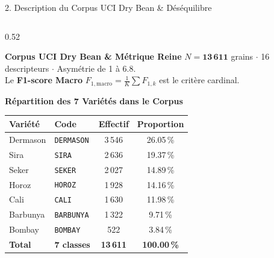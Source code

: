 \documentclass[aspectratio=169,10pt]{beamer}
\begin{document}
\begin{frame}{2. Description du Corpus UCI Dry Bean \& Déséquilibre}
    \begin{columns}[T]
        \begin{column}{0.52\textwidth}
            \begin{block}{\textbf{Corpus UCI Dry Bean \& Métrique Reine}}
                \scriptsize
                $N = \mathbf{13\,611}$ grains $\cdot$ 16 descripteurs $\cdot$ Asymétrie de 1 à 6.8.\\
                Le \textbf{F1-score Macro} $F_{1,\text{macro}} = \frac{1}{K}\sum F_{1,k}$ est le critère cardinal.
            \end{block}
            \vspace{0.15cm}
            \begin{block}{\textbf{Répartition des 7 Variétés dans le Corpus}}
                \centering
                \scriptsize
                \begin{tabular}{@{}llcc@{}}
                    \toprule
                    \textbf{Variété} & \textbf{Code} & \textbf{Effectif} & \textbf{Proportion} \\
                    \midrule
                    Dermason & \texttt{DERMASON} & 3\,546 & 26.05\,\% \\
                    Sira     & \texttt{SIRA}     & 2\,636 & 19.37\,\% \\
                    Seker    & \texttt{SEKER}    & 2\,027 & 14.89\,\% \\
                    Horoz    & \texttt{HOROZ}    & 1\,928 & 14.16\,\% \\
                    Cali     & \texttt{CALI}     & 1\,630 & 11.98\,\% \\
                    Barbunya & \texttt{BARBUNYA} & 1\,322 & 9.71\,\%  \\
                    Bombay   & \texttt{BOMBAY}   & 522   & 3.84\,\%  \\
                    \midrule
                    \textbf{Total} & \textbf{7 classes} & \textbf{13\,611} & \textbf{100.00\,\%} \\
                    \bottomrule
                \end{tabular}
            \end{block}
        \end{column}

\end{columns}
\end{frame}
\end{document}
